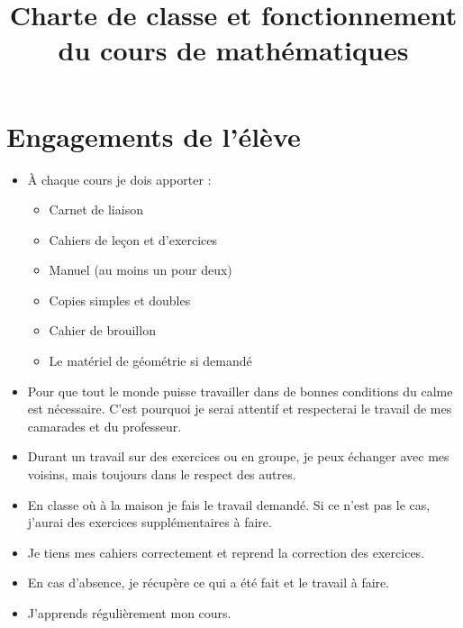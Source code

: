 \documentclass[a4paper, 11pt]{article}
\author{}
\title{Charte de classe et fonctionnement du cours de mathématiques}
\date{}
\begin{document}
\maketitle	
\thispagestyle{empty}

\vspace*{-1cm}
	
\section{Engagements de l'élève}

\begin{itemize}
	
	\item \`A chaque cours je dois apporter :
		\begin{itemize}
			\item Carnet de liaison
			\item Cahiers de leçon et d'exercices
			\item Manuel (au moins un pour deux)
			\item Copies simples et doubles
			\item Cahier de brouillon
			\item Le matériel de géométrie si demandé
			
		\end{itemize}
	
	\item Pour que tout le monde puisse travailler dans de bonnes conditions du calme est nécessaire. C'est pourquoi je serai attentif et respecterai le travail de mes camarades et du professeur.
	
	\item Durant un travail sur des exercices ou en groupe, je peux échanger avec mes voisins, mais toujours dans le respect des autres.
	
	\item En classe où à la maison je fais le travail demandé. Si ce n'est pas le cas, j'aurai des exercices supplémentaires à faire.
	
	\item Je tiens mes cahiers correctement et reprend la correction des exercices.
	
	\item En cas d'absence, je récupère ce qui a été fait et le travail à faire.
	
	\item J'apprends régulièrement mon cours. 
\end{itemize}
	
\end{document}
